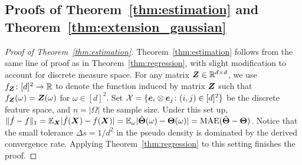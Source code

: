 \documentclass[11pt]{article}
\theoremstyle{plain}
\theoremstyle{definition}
\begin{document}
\subsection{Proofs of Theorem~\ref{thm:estimation} and Theorem~\ref{thm:extension_gaussian}}\label{sec:sub-Gaussian}
\begin{proof}[Proof of Theorem~\ref{thm:estimation}]
Theorem~\ref{thm:estimation} follows from the same line of proof as in Theorem~\ref{thm:regression}, with slight modification to account for discrete measure space. For any matrix $\bm Z\in\mathbb{R}^{d\times d}$, we use $f_{\bm Z}\colon[d]^2 \to \mathbb{R}$ to denote the function induced by matrix $\bm Z$ such that $f_{\bm Z}(\omega)=\bm Z(\omega)$ for $\omega\in[d]^2$. Set $\mathcal{X}=\{\bm{e}_i\otimes\bm{e}_j\colon(i,j)\in[d]^2\}$ be the discrete feature space, and $n=|\Omega|$ the sample size. Under this set up, $\lVert\hat f - f\rVert_1=\mathbb{E}_{\bm X}|\hat f (\bm X)- f(\bm X)| = \mathbb{E}_{\omega}|\hat {\bm{\Theta}}(\omega)-\bm{\Theta}(\omega)|=\textup{MAE}(\hat {\bm{\Theta}}-\bm{\Theta})$. Notice that the small tolerance $\Delta s=1/d^2$ in the pseudo density is dominated by the derived convergence rate. Applying Theorem~\ref{thm:regression} to this setting finishes the proof. 
\end{proof}
\end{document}
